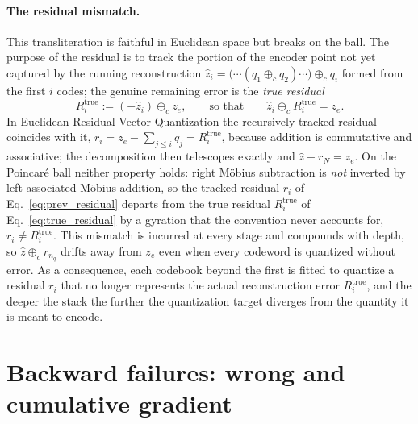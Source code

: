 \documentclass[12pt]{report}
\begin{document}
\paragraph{The residual mismatch.} This transliteration is faithful in Euclidean space but breaks on the ball. The purpose of the residual is to track the portion of the encoder point not yet captured by the running reconstruction $\hat z_i = \big(\cdots(q_1\oplus_c q_2)\cdots\big)\oplus_c q_i$ formed from the first $i$ codes; the genuine remaining error is the \emph{true residual}
\begin{equation}
    \label{eq:true_residual}
    R_i^{\text{true}} := (-\hat z_i)\oplus_c z_e,
    \qquad\text{so that}\qquad
    \hat z_i \oplus_c R_i^{\text{true}} = z_e .
\end{equation}
In Euclidean Residual Vector Quantization the recursively tracked residual coincides with it, $r_i = z_e - \sum_{j\le i} q_j = R_i^{\text{true}}$, because addition is commutative and associative; the decomposition then telescopes exactly and $\hat z + r_{N} = z_e$. On the Poincar\'e ball neither property holds: right M\"obius subtraction is \emph{not} inverted by left-associated M\"obius addition, so the tracked residual $r_i$ of Eq.~\ref{eq:prev_residual} departs from the true residual $R_i^{\text{true}}$ of Eq.~\ref{eq:true_residual} by a gyration that the convention never accounts for, $r_i \neq R_i^{\text{true}}$. This mismatch is incurred at every stage and compounds with depth, so $\hat z\oplus_c r_{n_q}$ drifts away from $z_e$ even when every codeword is quantized without error. As a consequence, each codebook beyond the first is fitted to quantize a residual $r_i$ that no longer represents the actual reconstruction error $R_i^{\text{true}}$, and the deeper the stack the further the quantization target diverges from the quantity it is meant to encode.


\section{Backward failures: wrong and cumulative gradient}
\label{sec:firewall}
\end{document}
